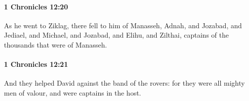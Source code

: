 		\paragraph{1 Chronicles 12:20} %
			\label{1CHRONICLES-12-20}

			As he went to Ziklag, there fell to him of Manasseh, Adnah, and Jozabad, and Jediael, and Michael, and Jozabad, and Elihu, and Zilthai, captains of the thousands that were of Manasseh.


		\paragraph{1 Chronicles 12:21} %
			\label{1CHRONICLES-12-21}

			And they helped David against the band of the rovers: for they were all mighty men of valour, and were captains in the host.


